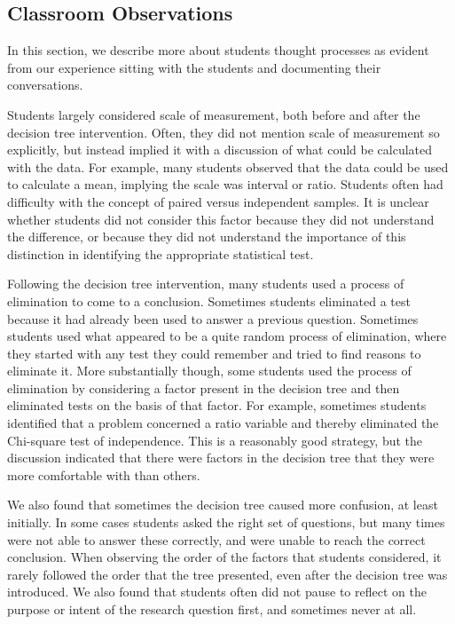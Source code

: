 \documentclass[12pt]{article}
\begin{document}
\subsection{Classroom Observations}

In this section, we describe more about students thought processes as evident from our experience sitting with the students and documenting their conversations.  

Students largely considered scale of measurement, both before and after the decision tree intervention.  Often, they did not mention scale of measurement so explicitly, but instead implied it with a discussion of what could be calculated with the data.  For example, many students observed that the data could be used to calculate a mean, implying the scale was interval or ratio.  Students often had difficulty with the concept of paired versus independent samples.  It is unclear whether students did not consider this factor because they did not understand the difference, or because they did not understand the importance of this distinction in identifying the appropriate statistical test.  

Following the decision tree intervention, many students used a process of elimination to come to a conclusion.  Sometimes students eliminated a test because it had already been used to answer a previous question.  Sometimes students used what appeared to be a quite random process of elimination, where they started with any test they could remember and tried to find reasons to eliminate it.  More substantially though, some students used the process of elimination by considering a factor present in the decision tree and then eliminated tests on the basis of that factor.  For example, sometimes students identified that a problem concerned a ratio variable and thereby eliminated the Chi-square test of independence.  This is a reasonably good strategy, but the discussion indicated that there were factors in the decision tree that they were more comfortable with than others.

We also found that sometimes the decision tree caused more confusion, at least initially.  In some cases students asked the right set of questions, but many times were not able to answer these correctly, and were unable to reach the correct conclusion.  When observing the order of the factors that students considered, it rarely followed the order that the tree presented, even after the decision tree was introduced.  We also found that students often did not pause to reflect on the purpose or intent of the research question first, and sometimes never at all.  
\end{document}
